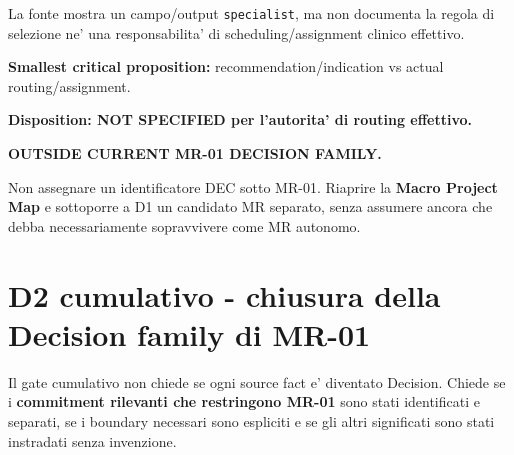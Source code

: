 \documentclass[11pt,a4paper]{article}
\begin{document}
La fonte mostra un campo/output \texttt{specialist}, ma non documenta la regola di selezione ne' una responsabilita' di scheduling/assignment clinico effettivo.\par
\textbf{Smallest critical proposition:} recommendation/indication vs actual routing/assignment.\par
\textbf{Disposition: NOT SPECIFIED per l'autorita' di routing effettivo.}

\begin{ddtacore}[title={Specialist candidate disposition}]
\textbf{OUTSIDE CURRENT MR-01 DECISION FAMILY.}\par
Non assegnare un identificatore DEC sotto MR-01. Riaprire la \textbf{Macro Project Map} e sottoporre a D1 un candidato MR separato, senza assumere ancora che debba necessariamente sopravvivere come MR autonomo.
\end{ddtacore}

\section{D2 cumulativo - chiusura della Decision family di MR-01}
\closedtag

Il gate cumulativo non chiede se ogni source fact e' diventato Decision. Chiede se i \textbf{commitment rilevanti che restringono MR-01} sono stati identificati e separati, se i boundary necessari sono espliciti e se gli altri significati sono stati instradati senza invenzione.
\end{document}
